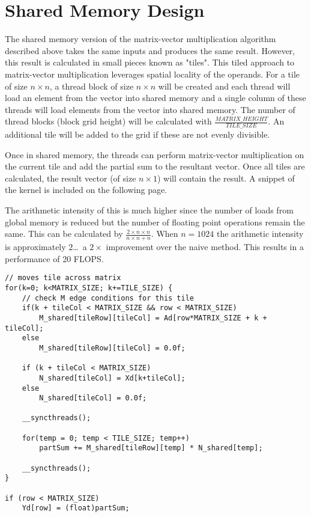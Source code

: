 \documentclass[12pt]{article}
\begin{document}
\pagebreak
\vspace{-0.6cm}
\section{Shared Memory Design}

\vspace{-0.4cm}

The shared memory version of the matrix-vector multiplication
algorithm described above takes the same inputs and produces
the same result. However, this result is calculated in small
pieces known as "tiles". This tiled approach to matrix-vector
multiplication leverages spatial locality of the operands.
For a tile of size $n \times n$, a thread block of size $n \times n$
will be created and each thread will load an element from the
vector into shared memory 
and a single column of these threads will load elements from the
vector into shared memory. The number of thread blocks (block grid
height) will be calculated with $\frac{MATRIX\_HEIGHT}{TILE\_SIZE}$.
An additional tile will be added to the grid if these are not evenly
divisible. 

Once in shared memory, the threads can perform matrix-vector
multiplication on the current tile and add the partial sum
to the resultant vector. Once all tiles are calculated,
the result vector (of size $n \times 1$) will contain the result.
A snippet of the kernel is included on the following page.

The arithmetic intensity of this is much higher since the number
of loads from global memory is reduced but the number of floating
point operations remain the same. This can be calculated by 
$\frac{2\times n\times n}{n\times n+n}$. When $n=1024$ the arithmetic
intensity is approximately $2$\dots\ a $2\times$ improvement over the naive
method. This results in a performance of 20 FLOPS.


\newpage
\vspace{1cm}
\begin{verbatim}
// moves tile across matrix
for(k=0; k<MATRIX_SIZE; k+=TILE_SIZE) {
    // check M edge conditions for this tile
    if(k + tileCol < MATRIX_SIZE && row < MATRIX_SIZE)
        M_shared[tileRow][tileCol] = Ad[row*MATRIX_SIZE + k + tileCol];
    else
        M_shared[tileRow][tileCol] = 0.0f;

    if (k + tileCol < MATRIX_SIZE)
        N_shared[tileCol] = Xd[k+tileCol];
    else
        N_shared[tileCol] = 0.0f;

    __syncthreads();

    for(temp = 0; temp < TILE_SIZE; temp++)
        partSum += M_shared[tileRow][temp] * N_shared[temp];

    __syncthreads();
}

if (row < MATRIX_SIZE)
    Yd[row] = (float)partSum;
\end{verbatim}
\end{document}
